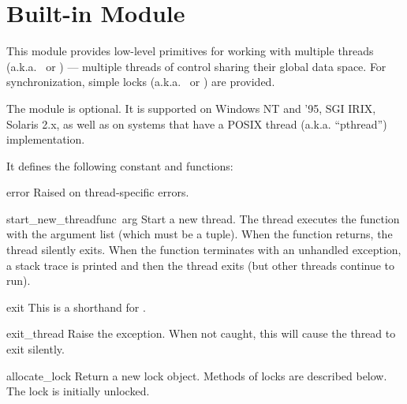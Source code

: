 \section{Built-in Module }
\label{module-thread}

This module provides low-level primitives for working with multiple
threads (a.k.a.\  or ) --- multiple
threads of control sharing their global data space.  For
synchronization, simple locks (a.k.a.\  or ) are provided.

The module is optional.  It is supported on Windows NT and '95, SGI
IRIX, Solaris 2.x, as well as on systems that have a POSIX thread
(a.k.a. ``pthread'') implementation.

It defines the following constant and functions:

\renewcommand{\indexsubitem}{(in module thread)}
\begin{excdesc}{error}
Raised on thread-specific errors.
\end{excdesc}

\begin{funcdesc}{start_new_thread}{func\, arg}
Start a new thread.  The thread executes the function 
with the argument list  (which must be a tuple).  When the
function returns, the thread silently exits.  When the function
terminates with an unhandled exception, a stack trace is printed and
then the thread exits (but other threads continue to run).
\end{funcdesc}

\begin{funcdesc}{exit}{}
This is a shorthand for .
\end{funcdesc}

\begin{funcdesc}{exit_thread}{}
Raise the  exception.  When not caught, this will
cause the thread to exit silently.
\end{funcdesc}


\begin{funcdesc}{allocate_lock}{}
Return a new lock object.  Methods of locks are described below.  The
lock is initially unlocked.
\end{funcdesc}

